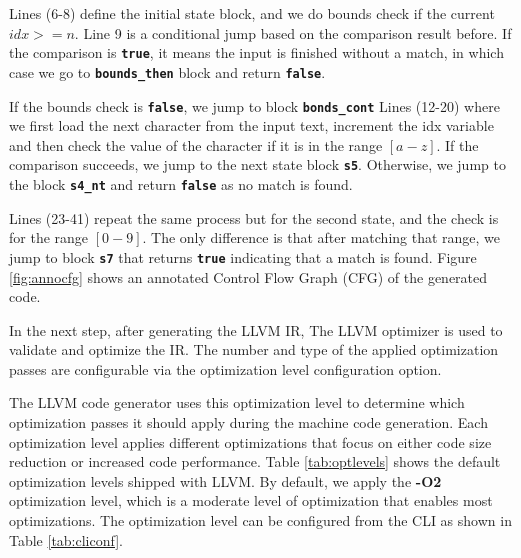Lines (6-8) define the initial state block, and we do bounds check if the current $idx >= n$. Line 9 is a conditional jump based on the comparison result before. If the comparison is \texttt{\textbf{true}}, it means the input is finished without a match, in which case we go to \texttt{\textbf{bounds\_then}} block and return \texttt{\textbf{false}}.

If the bounds check is \texttt{\textbf{false}}, we jump to block \texttt{\textbf{bonds\_cont}} Lines (12-20) where we first load the next character from the input text, increment the idx variable and then check the value of the character if it is in the range $[a - z]$. If the comparison succeeds, we jump to the next state block \texttt{\textbf{s5}}. Otherwise, we jump to the block \texttt{\textbf{s4\_nt}} and return \texttt{\textbf{false}} as no match is found.

Lines (23-41) repeat the same process but for the second state, and the check is for the range $[0-9]$. The only difference is that after matching that range, we jump to block \texttt{\textbf{s7}} that returns \texttt{\textbf{true}} indicating that a match is found. Figure \ref{fig:annocfg} shows an annotated Control Flow Graph (CFG) of the generated code.

In the next step, after generating the LLVM IR, The LLVM optimizer is used to validate and optimize the IR. The number and type of the applied optimization passes are configurable via the optimization level configuration option.

The LLVM code generator uses this optimization level to determine which optimization passes it should apply during the machine code generation. Each optimization level applies different optimizations that focus on either code size reduction or increased code performance. Table \ref{tab:optlevels} shows the default optimization levels shipped with LLVM. By default, we apply the \textbf{-O2} optimization level, which is a moderate level of optimization that enables most optimizations. The optimization level can be configured from the CLI as shown in Table \ref{tab:cliconf}.

